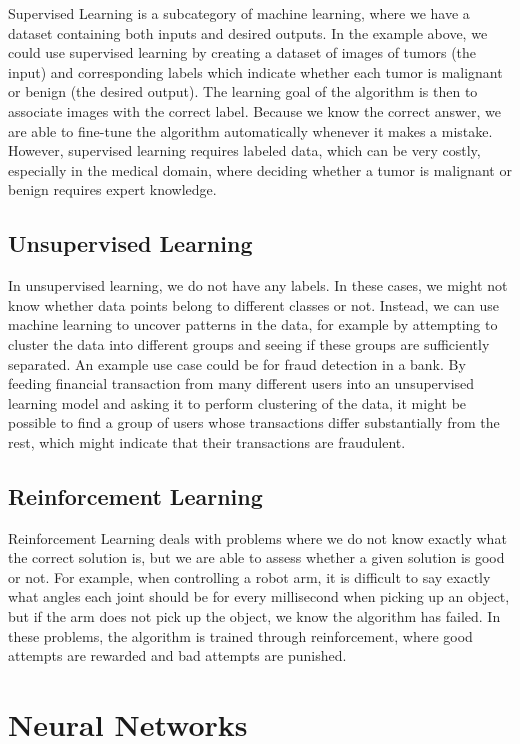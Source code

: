 \documentclass[UKenglish]{uiomasterthesis} %
\theoremstyle{definition}
\begin{document}
Supervised Learning is a subcategory of machine learning, where we have a dataset containing both inputs and desired outputs. In the example above, we could use supervised learning by creating a dataset of images of tumors (the input) and corresponding labels which indicate whether each tumor is malignant or benign (the desired output). The learning goal of the algorithm is then to associate images with the correct label. Because we know the correct answer, we are able to fine-tune the algorithm automatically whenever it makes a mistake. However, supervised learning requires labeled data, which can be very costly, especially in the medical domain, where deciding whether a tumor is malignant or benign requires expert knowledge.

\subsection{Unsupervised Learning}

In unsupervised learning, we do not have any labels. In these cases, we might not know whether data points belong to different classes or not. Instead, we can use machine learning to uncover patterns in the data, for example by attempting to cluster the data into different groups and seeing if these groups are sufficiently separated. An example use case could be for fraud detection in a bank. By feeding financial transaction from many different users into an unsupervised learning model and asking it to perform clustering of the data, it might be possible to find a group of users whose transactions differ substantially from the rest, which might indicate that their transactions are fraudulent.

\subsection{Reinforcement Learning}

Reinforcement Learning deals with problems where we do not know exactly what the correct solution is, but we are able to assess whether a given solution is good or not. For example, when controlling a robot arm, it is difficult to say exactly what angles each joint should be for every millisecond when picking up an object, but if the arm does not pick up the object, we know the algorithm has failed. In these problems, the algorithm is trained through reinforcement, where good attempts are rewarded and bad attempts are punished.

\section{Neural Networks}
\end{document}
